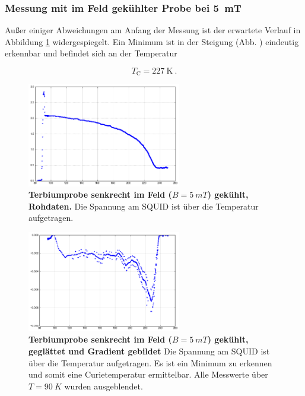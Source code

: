 \documentclass[a4paper,ngerman]{scrartcl}
\begin{document}
\subsubsection*{Messung mit im Feld gekühlter Probe bei \SI{5}{mT}}

Außer einiger Abweichungen am Anfang der Messung ist der erwartete Verlauf in Abbildung \ref{fig:Tb_p_5} widergespiegelt.
Ein Minimum ist in der Steigung (Abb. ) eindeutig erkennbar und befindet sich an der Temperatur

\begin{equation}
T_{\mathrm{C}} = \SI{227}{\K} ~.
\end{equation}



\begin{figure}
\centering
\includegraphics[width=0.6\textwidth]{abbildungen/Tb_p_5.png}
\caption[Terbiumprobe parallel bei 5mT]{\textbf{Terbiumprobe senkrecht im Feld ($B = \SI{5}{mT}$) gekühlt, Rohdaten.} 
Die Spannung am SQUID ist über die Temperatur aufgetragen. }
\label{fig:Tb_p_5}
\end{figure}

\begin{figure}
\centering
\includegraphics[width=0.6\textwidth]{abbildungen/Tb_p_5_grad.png}
\caption[Terbiumprobe parallel bei 5mT]{\textbf{Terbiumprobe senkrecht im Feld ($B = \SI{5}{mT}$) gekühlt, geglättet und Gradient gebildet} 
Die Spannung am SQUID ist über die Temperatur aufgetragen. 
Es ist ein Minimum zu erkennen und somit eine Curietemperatur ermittelbar.
Alle Messwerte über $T =\SI{90}{K}$ wurden ausgeblendet.}
\label{fig:Tb_p_5_grad}
\end{figure}
\end{document}
